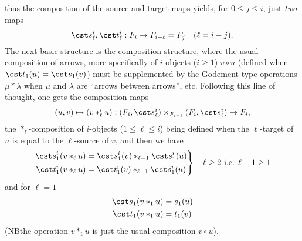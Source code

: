 thus the composition of the source and target maps yields, for $0\le
j\le i$, just \emph{two} maps
\begin{equation*}
  \cst s_\ell^i, \cst t_\ell^i : F_i \to F_{i-\ell} = F_j \quad (\ell = i-j).
\end{equation*}
The next basic structure is the composition structure, where the
usual composition of arrows, more specifically of $i$-objects
($i\ge1$) $v \circ u$ (defined when $\cst t_1(u)=\cst s_1(v)$) must be
supplemented by the Godement-type operations $\mu * \lambda$ when
$\mu$ and $\lambda$ are ``arrows between arrows'', etc. Following this
line of thought, one gets the composition maps
\begin{equation*}
  (u,v) \mapsto (v *_{\ell}^i u) : (F_i, \cst s_\ell^i) \times_{F_{i-\ell}}
  (F_i,\cst s_\ell^i) \to F_i,
\end{equation*}
the $*_\ell$-composition of $i$-objects ($1\le \ell\le i$) being defined
when the $\ell$-target of $u$ is equal to the $\ell$-source of $v$,
and then we have
\begin{equation*}
  \left.\begin{aligned}
    \cst s_1^i(v *_\ell u) &=  \cst s_1^i(v) *_{\ell-1} \cst s_1^i(u) \\
    \cst t_1^i(v *_\ell u) &=  \cst t_1^i(v) *_{\ell-1} \cst s_1^i(u)
    \end{aligned}\right\}
  \quad \text{$\ell\ge2$ i.e. $\ell-1\ge1$}
\end{equation*}
and for $\ell=1$
\begin{align*}
  \cst s_1(v *_1 u) &= s_1(u) \\
  \cst t_1(v *_1 u) &= t_1(v)
\end{align*}
(NB\enspace the operation $v *_1 u$ is just the usual composition $v \circ
u$).

